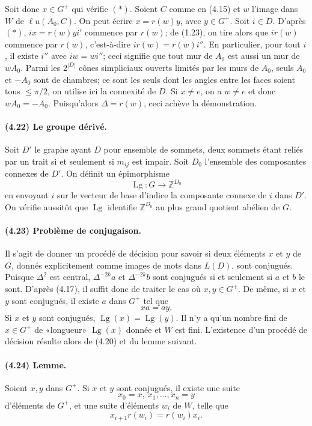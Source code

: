 \documentclass[10pt,a4paper]{article}
\newcommand{\Z}{\mathbb Z}
\begin{document}
Soit donc \(x\in G^+\) qui vérifie \((*)\). Soient \(C\) comme en (4.15) et \(w\) l'image dans \(W\) de \(\ell u(A_0,C)\). On peut écrire \(x=r(w)y\), avec \(y\in G^+\). Soit \(i\in D\). D'après \((*)\), \(ix=r(w)yi'\) commence par \(r(w)\); de (1.23), on tire alors que \(ir(w)\) commence par \(r(w)\), c'est-à-dire \(ir(w)=r(w)i''\). En particulier, pour tout \(i\), il existe \(i''\) avec \(iw=wi''\); ceci signifie que tout mur de \(A_0\) est aussi un mur de \(wA_0\). Parmi les \(2^{|D|}\) cônes simpliciaux ouverts limités par les murs de \(A_0\), seuls \(A_0\) et \(-A_0\) sont de chambres; ce sont les seuls dont les angles entre les faces soient tous \(\le\pi/2\), on utilise ici la connexité de \(D\). Si \(x\ne e\), on a \(w\ne e\) et donc \(wA_0=-A_0\). Puisqu'alors \(\Delta=r(w)\), ceci achève la démonstration.

\paragraph{(4.22) Le groupe dérivé.} Soit \(D'\) le graphe ayant \(D\) pour ensemble de sommets, deux sommets étant reliés par un trait si et seulement si \(m_{ij}\) est impair. Soit \(D_0\) l'ensemble des composantes connexes de \(D'\). On définit un épimorphisme
\[
\operatorname{Lg}:G\longrightarrow\Z^{D_0}
\]
en envoyant \(i\) sur le vecteur de base d'indice la composante connexe de \(i\) dans \(D'\). On vérifie aussitôt que \(\operatorname{Lg}\) identifie \(\Z^{D_0}\) au plus grand quotient abélien de \(G\).

\paragraph{(4.23) Problème de conjugaison.} Il s'agit de donner un procédé de décision pour savoir si deux éléments \(x\) et \(y\) de \(G\), donnés explicitement comme images de mots dans \(L(D)\), sont conjugués. Puisque \(\Delta^2\) est central, \(\Delta^{-2k}a\) et \(\Delta^{-2k}b\) sont conjugués si et seulement si \(a\) et \(b\) le sont. D'après (4.17), il suffit donc de traiter le cas où \(x,y\in G^+\). De même, si \(x\) et \(y\) sont conjugués, il existe \(a\) dans \(G^+\) tel que
\[
xa=ay.
\]
Si \(x\) et \(y\) sont conjugués, \(\operatorname{Lg}(x)=\operatorname{Lg}(y)\). Il n'y a qu'un nombre fini de \(x\in G^+\) de «longueur» \(\operatorname{Lg}(x)\) donnée et \(W\) est fini. L'existence d'un procédé de décision résulte alors de (4.20) et du lemme suivant.

\paragraph{(4.24) Lemme.} Soient \(x,y\) dans \(G^+\). Si \(x\) et \(y\) sont conjugués, il existe une suite
\[
x_0=x,\ x_1,\ldots,x_n=y
\]
d'éléments de \(G^+\), et une suite d'éléments \(w_i\) de \(W\), telle que
\[
x_{i+1}r(w_i)=r(w_i)x_i.
\]
\end{document}
